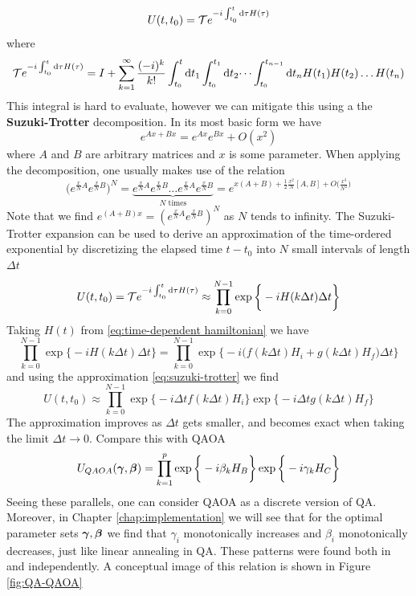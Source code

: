 \begin{equation}
U(t,t_0) = \mathcal{T}e^{-i\int_{t_0}^t \mathop{}\!\mathrm{d} \tau H(\tau)}
\end{equation}
where 
\begin{equation}
	\mathcal{T}e^{-i\int_{t_0}^t \mathop{}\!\mathrm{d} \tau H(\tau)} = I + \sum_{k=1}^{\infty} \frac{(-i)^k}{k!} \int_{t_0}^t \mathop{}\!\mathrm{d} t_1 \int_{t_0}^{t_1} \mathop{}\!\mathrm{d} t_{2}\dots \int_{t_0}^{t_{n-1}} \mathop{}\!\mathrm{d} t_n H(t_1)H(t_2)\dots H(t_n)
\end{equation}
This integral is hard to evaluate, however we can mitigate this using a the \textbf{Suzuki-Trotter} decomposition. In its most basic form we have \cite{Suzuki05}
\begin{equation}
	e^{Ax+Bx} = e^{Ax}e^{Bx} + O(x^2)
	\label{eq:suzuki-trotter}
\end{equation}
where $A$ and $B$ are arbitrary matrices and $x$ is some parameter. When applying the decomposition, one usually makes use of the relation
\begin{equation}
	\bigg(e^{\frac{x}{N}A}e^{\frac{x}{N}B}\bigg)^N = \underbrace{e^{\frac{x}{N}A}e^{\frac{x}{N}B}\dots e^{\frac{x}{N}A}e^{\frac{x}{N}B}}_{N \text{ times}} = e^{x(A+B) + \frac{1}{2}\frac{x^2}{N}[A,B] +O\big(\frac{x^3}{N^2}\big)}
\end{equation}
Note that we find $e^{(A+B)x} = (e^{\frac{x}{N}A}e^{\frac{x}{N}B})^N$ as $N$ tends to infinity. The Suzuki-Trotter expansion can be used to derive an approximation of the time-ordered exponential by discretizing the elapsed time $t-t_0$ into $N$ small intervals of length $\Delta t$ \cite{SZBW18}
\begin{equation}
	U(t,t_0) = \mathcal{T}e^{-i\int_{t_0}^t \mathop{}\!\mathrm{d} \tau H(\tau)} \approx \prod_{k=0}^{N-1}\exp\bigg\{-iH(k\Delta t) \Delta t\bigg\} 
\end{equation}
Taking $H(t)$ from \eqref{eq:time-dependent hamiltonian} we have 
\begin{equation}
	\prod_{k=0}^{N-1}\exp\bigg\{-iH(k\Delta t) \Delta t\bigg\}  = \prod_{k=0}^{N-1}\exp\bigg\{-i\bigg(f(k\Delta t)H_i+ g(k\Delta t)H_f\bigg) \Delta t\bigg\}
\end{equation}
and using the approximation \eqref{eq:suzuki-trotter} we find 
\begin{equation}
	U(t,t_0) \approx \prod_{k=0}^{N-1}\exp\bigg\{-i\Delta tf(k\Delta t)H_i\bigg\}\exp\bigg\{-i\Delta t g(k\Delta t)H_f\bigg\}
\end{equation}
The approximation improves as $\Delta t$ gets smaller, and becomes exact when taking the limit $\Delta t \to 0$. Compare this with QAOA
\begin{equation}
	U_{QAOA}(\bm{\gamma},\bm{\beta}) = \prod_{k=1}^p \exp\bigg\{-i\beta_k H_B\bigg\}\exp\bigg\{-i\gamma_k H_C\bigg\}
\end{equation}
 Seeing these parallels, one can consider QAOA as a discrete version of QA. Moreover, in Chapter \ref{chap:implementation} we will see that for the optimal parameter sets $\bm{\gamma},\bm{\beta}$ we find that $\gamma_i$ monotonically increases and $\beta_i$ monotonically decreases, just like linear annealing in QA. These patterns were found both in \cite{ZWCPL18} and \cite{Crooks18} independently. A conceptual image of this relation is shown in Figure \ref{fig:QA-QAOA}


